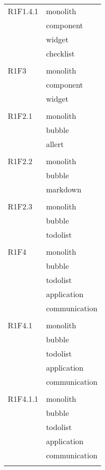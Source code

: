 \begin{center}
\begin{longtable}{|p{7cm}|p{5cm}|}
		R1F1.4.1 & monolith \\ & component \\ & widget \\ & checklist \\ & \\ \hline
		R1F3 & monolith \\ & component \\ & widget \\ & \\ \hline
		R1F2.1 & monolith \\ & bubble \\ & allert \\ & \\ \hline
		R1F2.2 & monolith \\ & bubble \\ & markdown \\ & \\ \hline
		R1F2.3 & monolith \\ & bubble \\ & todolist \\ & \\ \hline
		R1F4 & monolith \\ & bubble \\ & todolist \\ & application \\ & communication \\ & \\ \hline
		R1F4.1 & monolith \\ & bubble \\ & todolist \\ & application \\ & communication \\ & \\ \hline
		R1F4.1.1 & monolith \\ & bubble \\ & todolist \\ & application \\ & communication \\ & \\ \hline
	\end{longtable}
\end{center}

